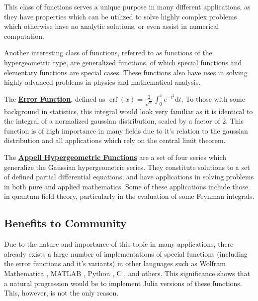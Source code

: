 \documentclass{article}
\theoremstyle{mytheoremstyle}
\theoremstyle{mytheoremstyle}
\theoremstyle{myproblemstyle}
\begin{document}
   \medskip
   This class of functions serves a unique purpose in many different applications, as they have properties which can be utilized to solve highly complex problems which otherwise have no analytic solutions, or even assist in numerical computation.

   \medskip
   Another interesting class of functions, referred to as functions of the hypergeometric type, are generalized functions, of which special functions and elementary functions are special cases.\cite{sf book, hypergeometric functions} 
   These functions also have uses in solving highly advanced problems in physics and mathematical analysis.

   \medskip
   The \href{https://github.com/JuliaMath/SpecialFunctions.jl/blob/master/src/erf.jl}{\textbf{Error Function}}, defined as $\operatorname{erf } (x)=\frac{2 }{\sqrt{\pi } }\int_{0}^{x} e ^{-t^2}\text{d}t$. 
   To those with some background in statistics, this integral would look very familiar as it is identical to the integral of a normalized gaussian distribution, scaled by a factor of 2. 
   This function is of high importance in many fields due to it's relation to the gaussian distribution and all applications which rely on the central limit theorem. 
   
   \medskip
   The \href{https://en.wikipedia.org/wiki/Appell_series}{\textbf{Appell Hypergeometric Functions}} are a set of four series which generalize the Gaussian hypergeometric series. 
   They constitute solutions to a set of defined partial differential equations, and have applications in solving problems in both pure and applied mathematics. 
   Some of these applications include those in quantum field theory, particularly in the evaluation of some Feynman integrals. \cite{appell app}


   \subsection*{Benefits to Community}\label{sub:Benefits to Community} %
   
   Due to the nature and importance of this topic in many applications, there already exists a large number of implementations of special functions (including the error functions and it's variants) in other languages such as Wolfram Mathematica \cite{wolfram special functions, wolfram hypergeometric}, MATLAB \cite{matlab special functions, matlab hypergeometric}, Python \cite{scipy, mpmath}, C \cite{mpfr, gsl, gnu clib, cephes, ARM, amos, toms}, and others.
   This significance shows that a natural progression would be to implement Julia versions of these functions. 
   This, however, is not the only reason.
\end{document}

